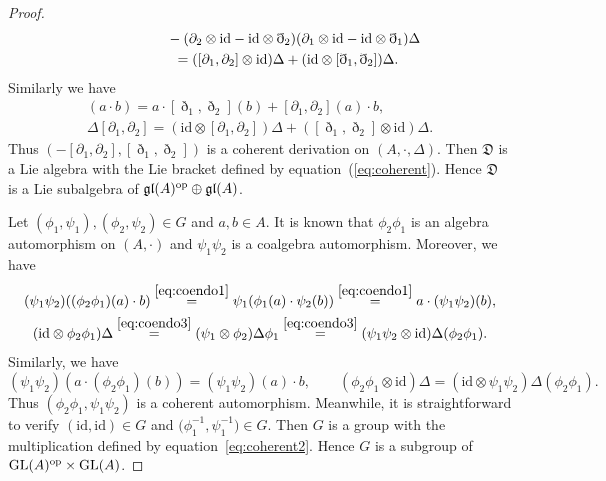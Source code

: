 \documentclass[10pt,a4paper]{amsart}
\numberwithin{equation}{section}
\newcommand{\id}{\mathrm{id}}
\begin{document}
\begin{proof}
\begin{gather*}
\hphantom{\Delta [\partial_1,\partial_2]=}{}
 - (\partial_2 \otimes \id - \id \otimes \eth_2)(\partial_1 \otimes \id - \id \otimes \eth_1)\Delta \\
 \hphantom{\Delta [\partial_1,\partial_2]}{}
= ([\partial_1,\partial_2] \otimes \id) \Delta + (\id \otimes [\eth_1,\eth_2])\Delta.
\end{gather*}
Similarly we have
\begin{gather*}
 [\eth_1,\eth_2](a \cdot b) = a \cdot [\eth_1,\eth_2](b) + [\partial_1,\partial_2](a) \cdot b, \\
 \Delta [\partial_1, \partial_2] = (\id \otimes [\partial_1, \partial_2])\Delta + ([\eth_1,\eth_2] \otimes \id )\Delta.
\end{gather*}
Thus $(-[\partial_1,\partial_2], [\eth_1,\eth_2])$ is a coherent derivation on $(A, \cdot, \Delta)$.
Then $\mathfrak{D}$ is a Lie algebra with the Lie bracket defined by equation~(\ref{eq:coherent}).
Hence $\mathfrak{D}$ is a Lie subalgebra of $\mathfrak{gl}(A)^{\rm op} \oplus \mathfrak{gl}(A)$.

Let $(\phi_1, \psi_1), (\phi_2,\psi_2) \in G$ and $a, b \in A$.
It is known that $\phi_2 \phi_1$ is an algebra automorphism on $(A, \cdot)$ and $\psi_1 \psi_2$ is a coalgebra automorphism. Moreover, we have
\begin{gather*}
 (\psi_1 \psi_2)((\phi_2 \phi_1)(a) \cdot b) \overset{\eqref{eq:coendo1}}{=} \psi_1(\phi_1(a) \cdot \psi_2(b)) \overset{\eqref{eq:coendo1}}{=} a \cdot (\psi_1\psi_2)(b), \\
 (\id \otimes \phi_2 \phi_1)\Delta \overset{\eqref{eq:coendo3}}{=} (\psi_1 \otimes \phi_2)\Delta \phi_1 \overset{\eqref{eq:coendo3}}{=} (\psi_1 \psi_2 \otimes \id)\Delta(\phi_2 \phi_1).
\end{gather*}
Similarly, we have
\begin{equation*}
 (\psi_1 \psi_2)(a \cdot (\phi_2 \phi_1)(b) ) = (\psi_1\psi_2)(a) \cdot b, \qquad (\phi_2 \phi_1 \otimes \id)\Delta = (\id \otimes \psi_1 \psi_2)\Delta(\phi_2 \phi_1).
\end{equation*}
Thus $(\phi_2 \phi_1, \psi_1 \psi_2)$ is a coherent automorphism.
Meanwhile, it is straightforward to verify $(\id, \id) \in G$ and $\big(\phi_1^{-1}, \psi_1^{-1}\big) \in G$.
Then $G$ is a group with the multiplication defined by equation~\eqref{eq:coherent2}.
Hence $G$ is a subgroup of ${\rm GL}(A)^{\rm op} \times {\rm GL}(A)$.


\end{proof}
\end{document}
